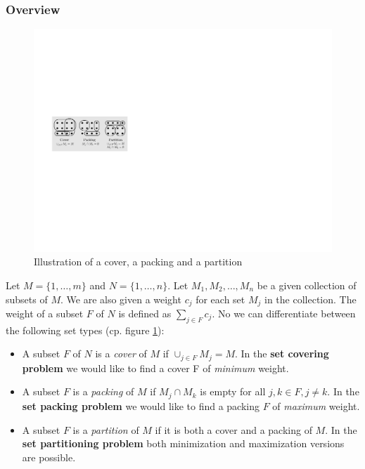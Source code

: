 \subsubsection{Overview}
\begin{figure}[htbp]
\begin{center}
\includegraphics{images/coverpackingpartition}
\caption{Illustration of a cover, a packing and a partition}
\label{fig:coverpackingpartition}
\end{center}
\end{figure}

Let $M = \{1, \ldots, m\}$ and $N=\{1, \ldots, n\}$. Let $M_1, M_2, \ldots, M_n$ be a given collection of subsets of $M$. We are also given a weight $c_j$ for each set $M_j$ in the collection. The weight of a subset $F$ of $N$ is defined as $\sum_{j \in F}c_j$. No we can differentiate between the following set types (cp. figure \ref{fig:coverpackingpartition}):

\begin{itemize}
	\item{A subset $F$ of $N$ is a \emph{cover} of $M$ if $\cup_{j \in F}M_j = M$. In the \textbf{set covering problem} we would like to find a cover F of \emph{minimum} weight.}
	\item{A subset $F$ is a \emph{packing} of $M$ if $M_j \cap M_k$ is empty for all $j,k \in F, j \neq k$. In the \textbf{set packing problem} we would like to find a packing $F$ of \emph{maximum} weight.}
	\item{A subset $F$ is a \emph{partition} of $M$ if it is both a cover and a packing of $M$. In the \textbf{set partitioning problem} both minimization and maximization versions are possible.}
\end{itemize}

